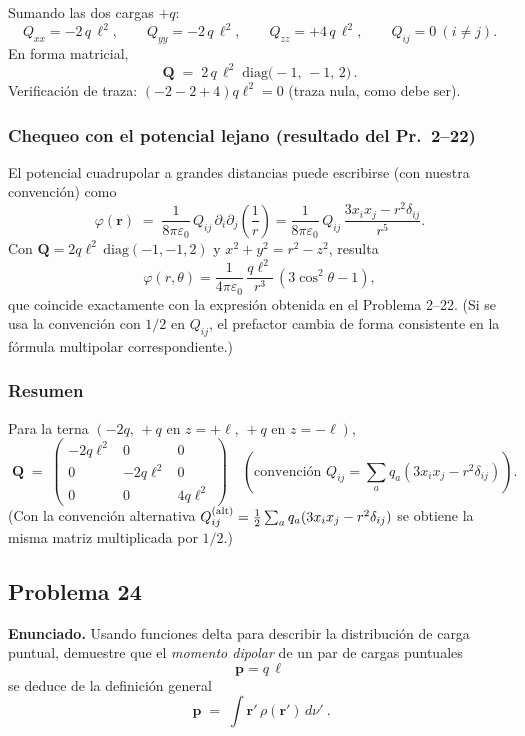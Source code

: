 \documentclass{article}
\begin{document}
Sumando las dos cargas $+q$:
\[
\boxed{\;
Q_{xx} = -2\,q\,\ell^2,\qquad
Q_{yy} = -2\,q\,\ell^2,\qquad
Q_{zz} = +4\,q\,\ell^2,\qquad
Q_{ij}=0\ (i\neq j).\;}
\]
En forma matricial,
\[
\boxed{\quad
\mathbf Q \;=\; 2\,q\,\ell^2\;
\mathrm{diag}\!\big(-1,\,-1,\,2\big)\,.
\quad}
\]
Verificación de traza: $(-2-2+4)q\ell^2=0$ (traza nula, como debe ser).

\subsubsection*{Chequeo con el potencial lejano (resultado del Pr.~2–22)}
El potencial cuadrupolar a grandes distancias puede escribirse (con nuestra convención) como
\[
\varphi(\mathbf r)\;=\;\frac{1}{8\pi\varepsilon_0}\,Q_{ij}\,\partial_i\partial_j\!\left(\frac{1}{r}\right)
=\frac{1}{8\pi\varepsilon_0}\,Q_{ij}\,\frac{3x_i x_j-r^2\delta_{ij}}{r^{5}}.
\]
Con $\mathbf Q=2q\ell^2\,\mathrm{diag}(-1,-1,2)$ y $x^2+y^2=r^2-z^2$, resulta
\[
\varphi(r,\theta)
=\frac{1}{4\pi\varepsilon_0}\,\frac{q\ell^2}{r^{3}}\,(3\cos^2\theta-1),
\]
que coincide exactamente con la expresión obtenida en el Problema 2–22. (Si se usa la convención con $1/2$ en $Q_{ij}$, el prefactor cambia de forma consistente en la fórmula multipolar correspondiente.)

\subsubsection*{Resumen}
Para la terna $(-2q,\, +q \text{ en } z=+\ell,\, +q \text{ en } z=-\ell)$,
\[
\boxed{\;
\mathbf Q \;=\; 
\begin{pmatrix}
-2q\ell^2 & 0 & 0\\
0 & -2q\ell^2 & 0\\
0 & 0 & 4q\ell^2
\end{pmatrix}
\quad(\text{convención } Q_{ij}=\sum_a q_a(3x_i x_j - r^2\delta_{ij})).
\;}
\]
(Con la convención alternativa $Q^{\rm(alt)}_{ij}=\tfrac{1}{2}\sum_a q_a(3x_i x_j - r^2\delta_{ij})$ se obtiene la misma matriz multiplicada por $1/2$.)


\subsection{Problema 24} \vspace{0.5cm}

\textbf{Enunciado.} Usando funciones delta para describir la distribución de carga puntual, demuestre que el \emph{momento dipolar} de un par de cargas puntuales
\[
\boxed{\ \mathbf p = q\,\boldsymbol{\ell}\ }
\]
se deduce de la definición general
\[
\boxed{\ \mathbf p \;=\; \displaystyle\int \mathbf r'\,\rho(\mathbf r')\,d\nu' \ }.
\]
\end{document}
